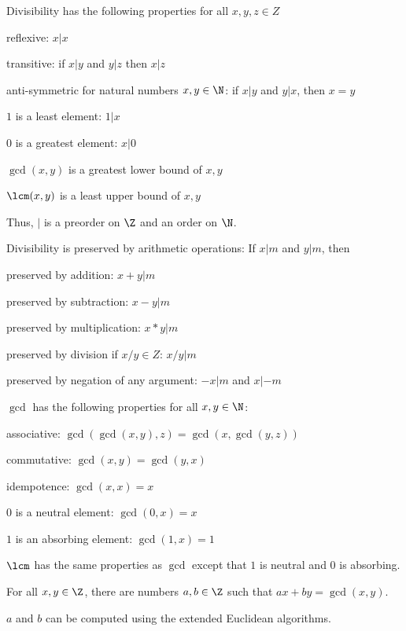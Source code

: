 \begin{theorem}[Divisibility]
Divisibility has the following properties for all $x,y,z\in Z$
\begin{compactitem}
\item reflexive: $x|x$
\item transitive: if $x|y$ and $y|z$ then $x|z$
\item anti-symmetric for natural numbers $x,y\in \N$: if $x|y$ and $y|x$, then $x=y$
\item $1$ is a least element: $1|x$
\item $0$ is a greatest element: $x|0$
\item $\gcd(x,y)$ is a greatest lower bound of $x,y$
\item $\lcm(x,y)$ is a least upper bound of $x,y$
\end{compactitem}
Thus, $|$ is a preorder on $\Z$ and an order on $\N$.
\medskip

Divisibility is preserved by arithmetic operations: If $x|m$ and $y|m$, then
\begin{compactitem}
\item preserved by addition: $x+y|m$
\item preserved by subtraction: $x-y|m$
\item preserved by multiplication: $x*y|m$
\item preserved by division if $x/y\in Z$: $x/y|m$
\item preserved by negation of any argument: $-x|m$ and $x|-m$
\end{compactitem}
\medskip

$\gcd$ has the following properties for all $x,y\in\N$:
\begin{compactitem}
\item associative: $\gcd(\gcd(x,y),z)=\gcd(x,\gcd(y,z))$
\item commutative: $\gcd(x,y)=\gcd(y,x)$
\item idempotence: $\gcd(x,x)=x$
\item $0$ is a neutral element: $\gcd(0,x)=x$
\item $1$ is an absorbing element: $\gcd(1,x)=1$
\end{compactitem}
$\lcm$ has the same properties as $\gcd$ except that $1$ is neutral and $0$ is absorbing.
\end{theorem}

\begin{theorem}\label{thm:math:extendedeuclid}
For all $x,y\in\Z$, there are numbers $a,b\in\Z$ such that $ax+by=\gcd(x,y)$.

$a$ and $b$ can be computed using the extended Euclidean algorithms.
\end{theorem}

